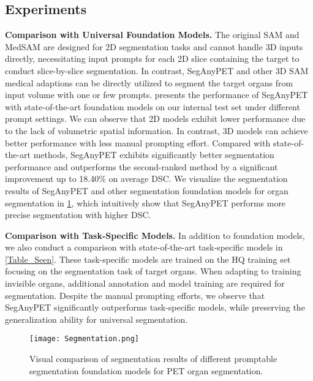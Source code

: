 \subsection{Experiments}

\textbf{Comparison with Universal Foundation Models.}
The original SAM \cite{SAM} and MedSAM \cite{MedSAM} are designed for 2D segmentation tasks and cannot handle 3D inputs directly,
necessitating input prompts for each 2D slice containing the target to conduct slice-by-slice segmentation.
In contrast, SegAnyPET and other 3D SAM medical adaptions \cite{SAM-Med3D} can be directly utilized to segment the target organs from input volume with one or few prompts. 
 presents the performance of SegAnyPET with state-of-the-art foundation models on our internal test set under different prompt settings.
We can observe that 2D models exhibit lower performance due to the lack of volumetric spatial information. In contrast, 3D models can achieve better performance with less manual prompting effort. Compared with state-of-the-art methods, SegAnyPET exhibits significantly better segmentation performance and outperforms the second-ranked method by a significant improvement up to 18.40\% on average DSC. 
We visualize the segmentation results of SegAnyPET and other segmentation foundation models for organ segmentation in \cref{organseg}, which intuitively show that SegAnyPET performs more precise segmentation with higher DSC.

\textbf{Comparison with Task-Specific Models.}
In addition to foundation models, we also conduct a comparison with state-of-the-art task-specific models in \cref{Table_Seen}. 
These task-specific models are trained on the HQ training set focusing on the segmentation task of target organs. When adapting to training invisible organs, additional annotation and model training are required for segmentation.
Despite the manual prompting efforts, we observe that SegAnyPET significantly outperforms task-specific models, while preserving the generalization ability for universal segmentation.


\begin{figure}
    \centering
	\texttt{[image: Segmentation.png]}
	\caption{Visual comparison of segmentation results of different promptable segmentation foundation models for PET organ segmentation.}
    \label{organseg}
\end{figure}




